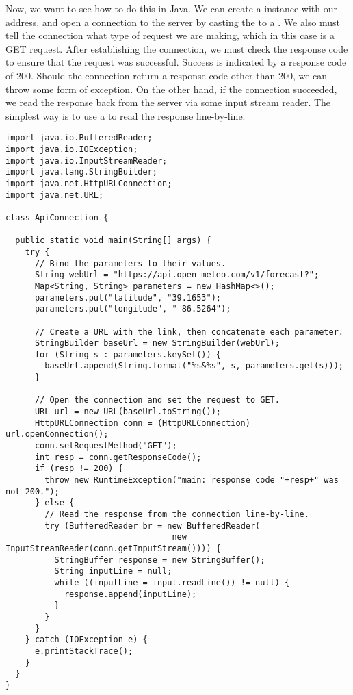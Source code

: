 Now, we want to see how to do this in Java. We can create a  instance with our address, and open a connection to the server by casting the  to a . We also must tell the connection what type of request we are making, which in this case is a GET request. After establishing the connection, we must check the response code to ensure that the request was successful. Success is indicated by a response code of 200. Should the connection return a response code other than 200, we can throw some form of exception. On the other hand, if the connection succeeded, we read the response back from the server via some input stream reader. The simplest way is to use a  to read the response line-by-line.

\begin{lstlisting}[language=MyJava]
import java.io.BufferedReader;
import java.io.IOException;
import java.io.InputStreamReader;
import java.lang.StringBuilder;
import java.net.HttpURLConnection;
import java.net.URL;

class ApiConnection {

  public static void main(String[] args) {
    try {
      // Bind the parameters to their values.
      String webUrl = "https://api.open-meteo.com/v1/forecast?";
      Map<String, String> parameters = new HashMap<>();
      parameters.put("latitude", "39.1653");
      parameters.put("longitude", "-86.5264");

      // Create a URL with the link, then concatenate each parameter.
      StringBuilder baseUrl = new StringBuilder(webUrl);
      for (String s : parameters.keySet()) { 
        baseUrl.append(String.format("%s&%s", s, parameters.get(s))); 
      }
    
      // Open the connection and set the request to GET.
      URL url = new URL(baseUrl.toString());
      HttpURLConnection conn = (HttpURLConnection) url.openConnection();
      conn.setRequestMethod("GET");
      int resp = conn.getResponseCode();
      if (resp != 200) {
        throw new RuntimeException("main: response code "+resp+" was not 200.");
      } else {
        // Read the response from the connection line-by-line.
        try (BufferedReader br = new BufferedReader(
                                  new InputStreamReader(conn.getInputStream()))) {
          StringBuffer response = new StringBuffer();
          String inputLine = null;
          while ((inputLine = input.readLine()) != null) { 
            response.append(inputLine); 
          }
        }
      }
    } catch (IOException e) {
      e.printStackTrace();
    }
  }
}
\end{lstlisting}


